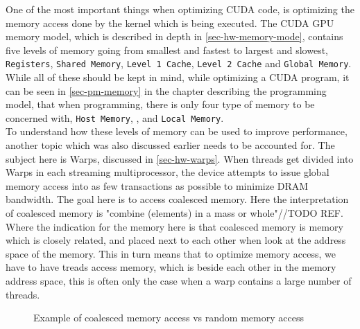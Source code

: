 One of the most important things when optimizing CUDA code, is optimizing the memory access done by the kernel which is being executed. The CUDA GPU memory model, which is described in depth in \cref{sec-hw-memory-mode}, contains five levels of memory going from smallest and fastest to largest and slowest, \texttt{Registers}, \texttt{Shared Memory}, \texttt{Level 1 Cache}, \texttt{Level 2 Cache} and \texttt{Global Memory}. While all of these should be kept in mind, while optimizing a CUDA program, it can be seen in \cref{sec-pm-memory} in the chapter describing the programming model, that when programming, there is only four type of memory to be concerned with, \texttt{Host Memory}, ,  and \texttt{Local Memory}.\\
To understand how these levels of memory can be used to improve performance, another topic which was also discussed earlier needs to be accounted for. The subject here is Warps, discussed in \cref{sec-hw-warps}. When threads get divided into Warps in each streaming multiprocessor, the device attempts to issue global memory access into as few transactions as possible to minimize DRAM bandwidth. The goal here is to access coalesced memory. Here the interpretation of coalesced memory is "combine (elements) in a mass or whole"//TODO REF. Where the indication for the memory here is that coalesced memory is memory which is closely related, and placed next to each other when look at the address space of the memory. This in turn means that to optimize memory access, we have to have treads access memory, which is beside each other in the memory address space, this is often only the case when a warp contains a large number of threads.\\

\begin{figure}[ht]
	\centering
	\caption{Example of coalesced memory access vs random memory access}
	\label{fig:coalesced_memory}
\end{figure}

